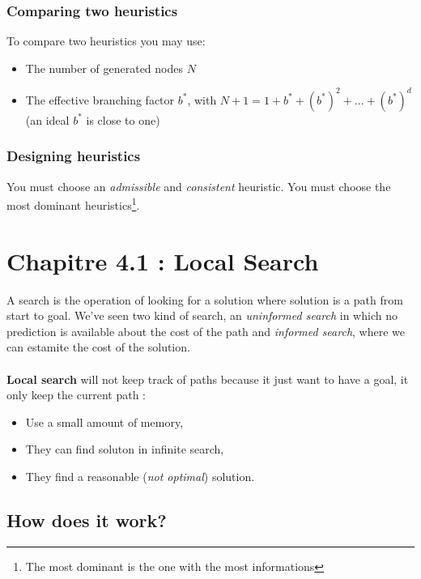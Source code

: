 \subsubsection{Comparing two heuristics}

To compare two heuristics you may use:
\begin{itemize}
\item The number of generated nodes $N$
\item The effective branching factor $b^*$, with $N+1 = 1 + b^* + (b^*)^2 + ... + (b^*)^d$ (an ideal $b^*$ is close to one)
\end{itemize}

\subsubsection{Designing heuristics}

You must choose an \textit{admissible} and \textit{consistent} heuristic. You must choose the most dominant heuristics\footnote{The most dominant is the one with the most informations}. 




\section{Chapitre 4.1 : Local Search}

A search  is the operation of  looking for a solution  where solution is
a  path  from  start  to  goal.  We've  seen  two  kind  of  search,  an
\textit{uninformed search} in which no prediction is available about the
cost of the path and \textit{informed search}, where we can estamite
the cost of the solution.

\paragraph{ }
\textbf{Local search} will not keep track of paths because it just want
to have a goal, it only keep the current path :
\begin{itemize}
    \item Use a small amount of memory,
    \item They can find soluton in infinite search,
    \item They find a reasonable (\textit{not optimal}) solution.
\end{itemize}

\subsection{How does it work?}

